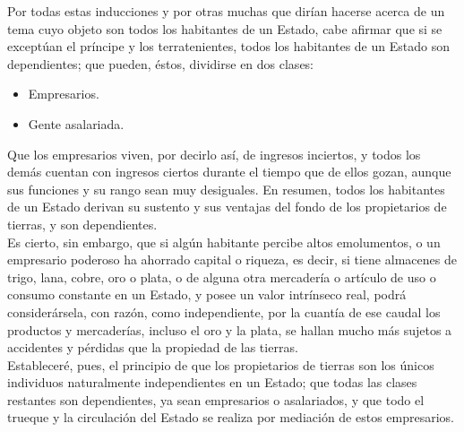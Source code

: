 \documentclass[10pt]{article}
\begin{document}
\begin{multicols}{1}
Por todas estas inducciones y por otras muchas que dirían hacerse acerca de un tema cuyo objeto son todos los habitantes de un Estado, cabe afirmar que si se exceptúan el príncipe y los terratenientes, todos los habitantes de un Estado son dependientes; que pueden, éstos, dividirse en dos clases:
\begin{itemize}
\item Empresarios.
\item Gente asalariada.
\end{itemize}
Que los empresarios viven, por decirlo así, de ingresos inciertos, y todos los demás cuentan con ingresos ciertos durante el tiempo que de ellos gozan, aunque sus funciones y su rango sean muy desiguales. En resumen, todos los habitantes de un Estado derivan su sustento y sus ventajas del fondo de los propietarios de tierras, y son dependientes.\\
Es cierto, sin embargo, que si algún habitante percibe altos emolumentos, o un empresario poderoso ha ahorrado capital o riqueza, es decir, si tiene almacenes de trigo, lana, cobre, oro o plata, o de alguna otra mercadería o artículo de uso o consumo constante en un Estado, y posee un valor intrínseco real, podrá considerársela, con razón, como independiente, por la cuantía de ese caudal los productos y mercaderías, incluso el oro y la plata, se hallan mucho más sujetos a accidentes y pérdidas que la propiedad de las tierras.\\
Estableceré, pues, el principio de que los propietarios de tierras son los únicos individuos naturalmente independientes en un Estado; que todas las clases restantes son dependientes, ya sean empresarios o asalariados, y que todo el trueque y la circulación del Estado se realiza por mediación de estos empresarios.

\end{multicols}
\end{document}
